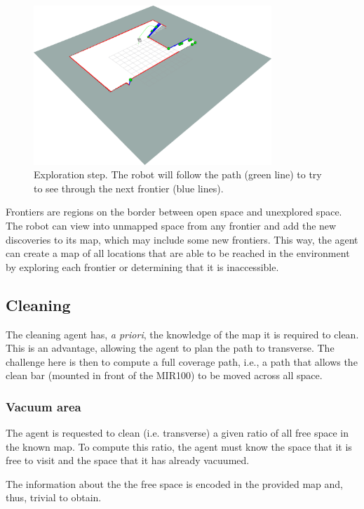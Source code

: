 \documentclass[]{article}
\begin{document}
\begin{figure}[ht]
    \centering
    \includegraphics[width=0.8\textwidth]{imgs/exploration_step.png}
    \caption{Exploration step. The robot will follow the path (green line) to try to see through the next frontier (blue lines).}
    \label{fig:exploration_step}
\end{figure}

Frontiers are regions on the border between open space and unexplored space. The robot can view into unmapped space from any frontier and add the new discoveries to its map, which may include some new frontiers. This way, the agent can create a map of all locations that are able to be reached in the environment by exploring each frontier or determining that it is inaccessible.

\subsection{Cleaning}

The cleaning agent has, \textit{a priori}, the knowledge of the map it is required to clean. This is an advantage, allowing the agent to plan the path to transverse. The challenge here is then to compute a full coverage path, i.e., a path that allows the clean bar (mounted in front of the MIR100) to be moved across all space.

\subsubsection{Vacuum area}

The agent is requested to clean (i.e. transverse) a given ratio of all free space in the known map. To compute this ratio, the agent must know the space that it is free to visit and the space that it has already vacuumed. 

The information about the the free space is encoded in the provided map and, thus, trivial to obtain.
\end{document}
